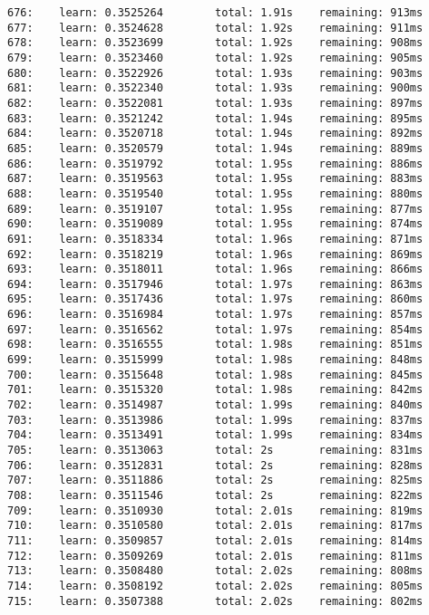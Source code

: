 \documentclass[11pt]{article}
\begin{document}
\begin{Verbatim}[commandchars=\\\{\}]
676:    learn: 0.3525264        total: 1.91s    remaining: 913ms
677:    learn: 0.3524628        total: 1.92s    remaining: 911ms
678:    learn: 0.3523699        total: 1.92s    remaining: 908ms
679:    learn: 0.3523460        total: 1.92s    remaining: 905ms
680:    learn: 0.3522926        total: 1.93s    remaining: 903ms
681:    learn: 0.3522340        total: 1.93s    remaining: 900ms
682:    learn: 0.3522081        total: 1.93s    remaining: 897ms
683:    learn: 0.3521242        total: 1.94s    remaining: 895ms
684:    learn: 0.3520718        total: 1.94s    remaining: 892ms
685:    learn: 0.3520579        total: 1.94s    remaining: 889ms
686:    learn: 0.3519792        total: 1.95s    remaining: 886ms
687:    learn: 0.3519563        total: 1.95s    remaining: 883ms
688:    learn: 0.3519540        total: 1.95s    remaining: 880ms
689:    learn: 0.3519107        total: 1.95s    remaining: 877ms
690:    learn: 0.3519089        total: 1.95s    remaining: 874ms
691:    learn: 0.3518334        total: 1.96s    remaining: 871ms
692:    learn: 0.3518219        total: 1.96s    remaining: 869ms
693:    learn: 0.3518011        total: 1.96s    remaining: 866ms
694:    learn: 0.3517946        total: 1.97s    remaining: 863ms
695:    learn: 0.3517436        total: 1.97s    remaining: 860ms
696:    learn: 0.3516984        total: 1.97s    remaining: 857ms
697:    learn: 0.3516562        total: 1.97s    remaining: 854ms
698:    learn: 0.3516555        total: 1.98s    remaining: 851ms
699:    learn: 0.3515999        total: 1.98s    remaining: 848ms
700:    learn: 0.3515648        total: 1.98s    remaining: 845ms
701:    learn: 0.3515320        total: 1.98s    remaining: 842ms
702:    learn: 0.3514987        total: 1.99s    remaining: 840ms
703:    learn: 0.3513986        total: 1.99s    remaining: 837ms
704:    learn: 0.3513491        total: 1.99s    remaining: 834ms
705:    learn: 0.3513063        total: 2s       remaining: 831ms
706:    learn: 0.3512831        total: 2s       remaining: 828ms
707:    learn: 0.3511886        total: 2s       remaining: 825ms
708:    learn: 0.3511546        total: 2s       remaining: 822ms
709:    learn: 0.3510930        total: 2.01s    remaining: 819ms
710:    learn: 0.3510580        total: 2.01s    remaining: 817ms
711:    learn: 0.3509857        total: 2.01s    remaining: 814ms
712:    learn: 0.3509269        total: 2.01s    remaining: 811ms
713:    learn: 0.3508480        total: 2.02s    remaining: 808ms
714:    learn: 0.3508192        total: 2.02s    remaining: 805ms
715:    learn: 0.3507388        total: 2.02s    remaining: 802ms

\end{Verbatim}
\end{document}
